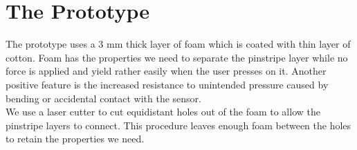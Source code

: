 \section{The Prototype}
The prototype uses a 3 mm thick layer of foam which is coated with thin layer of cotton. Foam has the properties we need to separate the pinstripe layer while no force is applied and yield rather easily when the user presses on it. Another positive feature is the increased resistance to unintended pressure caused by bending or accidental contact with the sensor.
\\
We use a  laser cutter to cut equidistant holes out of the foam to allow the pinstripe layers to connect. This procedure leaves enough foam between the holes to retain the properties we need. 
\\ \\

